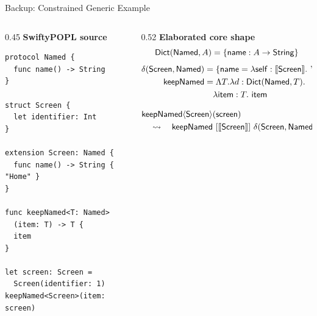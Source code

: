 \begin{frame}[fragile]{Backup: Constrained Generic Example}
\tiny
\begin{columns}[T]
\begin{column}{0.45\textwidth}
\textbf{SwiftyPOPL source}
\begin{lstlisting}[basicstyle=\ttfamily\tiny]
protocol Named {
  func name() -> String
}

struct Screen {
  let identifier: Int
}

extension Screen: Named {
  func name() -> String { "Home" }
}

func keepNamed<T: Named>
  (item: T) -> T {
  item
}

let screen: Screen =
  Screen(identifier: 1)
keepNamed<Screen>(item: screen)
\end{lstlisting}
\end{column}
\begin{column}{0.52\textwidth}
\textbf{Elaborated core shape}
\[
\mathsf{Dict}(\mathsf{Named},A)=\{\mathsf{name}:A\to\mathsf{String}\}
\]
\[
\begin{aligned}
\delta(\mathsf{Screen},\mathsf{Named})
&=
\{\mathsf{name}=\lambda\mathsf{self}:\llbracket \mathsf{Screen} \rrbracket.\ "Home"\}\\
\mathsf{keepNamed}
&=
\Lambda T.\lambda d:\mathsf{Dict}(\mathsf{Named},T).\\
&\quad \lambda\mathsf{item}:T.\ \mathsf{item}
\end{aligned}
\]

\[
\begin{aligned}
&\mathsf{keepNamed}\langle\mathsf{Screen}\rangle(\mathsf{screen})
\\
&\quad\leadsto\quad
\mathsf{keepNamed}\ [\llbracket \mathsf{Screen} \rrbracket]\
\delta(\mathsf{Screen},\mathsf{Named})\
\mathsf{screen}
\end{aligned}
\]
\end{column}
\end{columns}
\end{frame}
